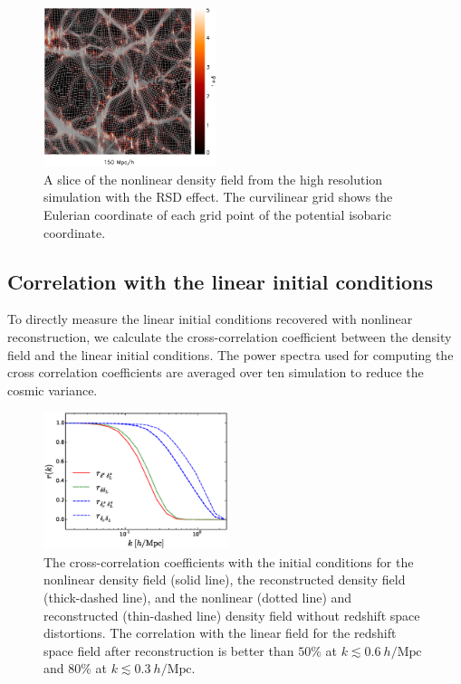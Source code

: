 \documentclass[aps,prd,twocolumn,superscriptaddress,groupedaddress,nofootinbib,amsfont]{revtex4}  %
\newcommand{\mr}{\mathrm}
\begin{document}
\begin{figure}[tbp]
\begin{center}
\includegraphics[width=0.45\textwidth]{map0512-0128_i0900_xz222_rsd3.eps}
\end{center}
\vspace{-0.7cm}
\caption{A slice of the nonlinear density field from the high resolution 
    simulation with the RSD effect. The curvilinear grid shows the Eulerian 
    coordinate of each grid point of the potential isobaric coordinate.}
\label{fig:map_rsd}
\end{figure}

\subsection{Correlation with the linear initial conditions}

To directly measure the linear initial conditions recovered with nonlinear 
reconstruction, we calculate the cross-correlation coefficient between the
density field and the linear initial conditions. 
The power spectra used for computing the cross correlation coefficients are 
averaged over ten simulation to reduce the cosmic variance.

\begin{figure}[tbp]
\begin{center}
\includegraphics[width=0.48\textwidth]{fa.eps}
\end{center}
\vspace{-0.7cm}
\caption{The cross-correlation coefficients with the initial conditions for the
    nonlinear density field (solid line), the reconstructed density field 
    (thick-dashed line), and the nonlinear (dotted line) and reconstructed 
    (thin-dashed line) density field without redshift space distortions.
    The correlation with the linear field for the redshift space field after 
    reconstruction is better than $50\%$ at $k\lesssim0.6\ h/\mr{Mpc}$ and 
    $80\%$ at $k\lesssim0.3\ h/\mr{Mpc}$.}
\label{fig:cc}
\end{figure}
\end{document}
